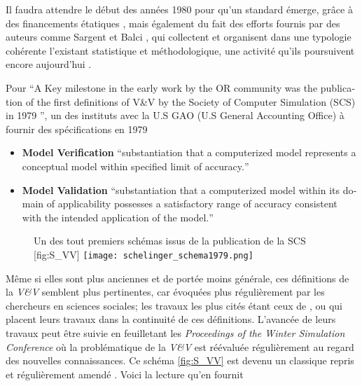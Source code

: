
Il faudra attendre le début des années 1980 pour qu'un standard émerge, grâce à des financements étatiques \autocite{Balci1986}, mais également du fait des efforts fournis par des auteurs comme Sargent et Balci \autocite{Nance2002}, qui collectent et organisent dans une typologie cohérente l'existant statistique et méthodologique, une activité qu'ils poursuivent encore aujourd'hui \autocite{Balci1998}.

Pour \autocite[22]{Oberkampf2010} \foreignquote{english}{A Key milestone in the early work by the OR community was the publication of the first definitions of V\&V by the Society of Computer Simulation (SCS) in 1979 \autocite{Schlesinger1979}}, un des instituts avec la U.S GAO (U.S General Accounting Office) à fournir des spécifications en 1979 \autocite{Balci1986}

\begin{itemize}
\item \textbf{Model Verification} \foreignquote{english}{substantiation that a computerized model represents a conceptual model within specified limit of accuracy.}
\item \textbf{Model Validation} \foreignquote{english}{substantiation that a computerized model within its domain of applicability possesses a satisfactory range of accuracy consistent with the intended application of the model.}
\end{itemize}

\begin{figure}[h]
\begin{sidecaption}[fortoc]{Un des tout premiers schémas issus de la publication de la SCS \autocite{Oberkampf2010,Schlesinger1979}}[fig:S_VV]
  \centering
 \texttt{[image: schelinger\_schema1979.png]}
  \end{sidecaption}
\end{figure}

Même si elles sont plus anciennes et de portée moins générale, ces définitions de la \textit{V\&V} semblent plus pertinentes, car évoquées plus régulièrement par les chercheurs en sciences sociales; les travaux les plus cités étant ceux de \textcite{Kleijnen1995}, ou \textcite{Sargent2010} qui placent leurs travaux dans la continuité de ces définitions. L'avancée de leurs travaux peut être suivie en feuilletant les \textit{Proceedings of the Winter Simulation Conference} où la problématique de la \textit{V\&V} est réévaluée régulièrement au regard des nouvelles connaissances. Ce schéma \ref{fig:S_VV} est devenu un classique repris et régulièrement amendé \autocite{Sargent2010}. Voici la lecture qu'en fournit \autocite{Oberkampf2010}

